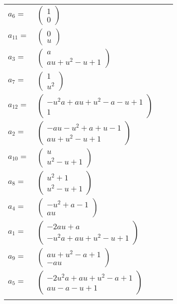 \documentclass[1p]{elsarticle_modified}
\theoremstyle{definition}
\begin{document}
\begin{tabular}{m{7pt} m{180pt} m{7pt} m{180pt} }
\flushright $a_{6}=$&$\begin{pmatrix}1\\0\end{pmatrix}$ \\
\flushright $a_{11}=$&$\begin{pmatrix}0\\u\end{pmatrix}$ \\
\flushright $a_{3}=$&$\begin{pmatrix}a\\a u+u^2- u+1\end{pmatrix}$ \\
\flushright $a_{7}=$&$\begin{pmatrix}1\\u^2\end{pmatrix}$ \\
\flushright $a_{12}=$&$\begin{pmatrix}- u^2 a+a u+u^2- a- u+1\\1\end{pmatrix}$ \\
\flushright $a_{2}=$&$\begin{pmatrix}- a u- u^2+a+u-1\\a u+u^2- u+1\end{pmatrix}$ \\
\flushright $a_{10}=$&$\begin{pmatrix}u\\u^2- u+1\end{pmatrix}$ \\
\flushright $a_{8}=$&$\begin{pmatrix}u^2+1\\u^2- u+1\end{pmatrix}$ \\
\flushright $a_{4}=$&$\begin{pmatrix}- u^2+a-1\\a u\end{pmatrix}$ \\
\flushright $a_{1}=$&$\begin{pmatrix}-2 a u+a\\- u^2 a+a u+u^2- u+1\end{pmatrix}$ \\
\flushright $a_{9}=$&$\begin{pmatrix}a u+u^2- a+1\\- a u\end{pmatrix}$ \\
\flushright $a_{5}=$&$\begin{pmatrix}-2 u^2 a+a u+u^2- a+1\\a u- a- u+1\end{pmatrix}$\\&\end{tabular}
\end{document}
